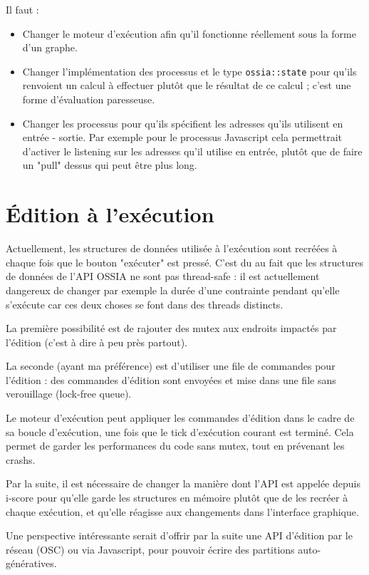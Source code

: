 \documentclass[french,a4paper,openany,12pt]{book}
\begin{document}
Il faut : 
\begin{itemize}
    \item Changer le moteur d'exécution afin qu'il fonctionne réellement sous la forme d'un graphe.
    \item Changer l'implémentation des processus et le type \lstinline|ossia::state| pour qu'ils renvoient un calcul à effectuer plutôt que le résultat de ce calcul ; c'est une forme d'évaluation paresseuse.
    \item Changer les processus pour qu'ils spécifient les adresses qu'ils utilisent en entrée - sortie.
    Par exemple pour le processus Javascript cela permettrait d'activer le listening sur les adresses qu'il utilise en entrée, 
    plutôt que de faire un "pull" dessus qui peut être plus long.
\end{itemize}

\section{Édition à l'exécution}
Actuellement, les structures de données utilisée à l'exécution sont recréées à chaque fois que le bouton "exécuter" est pressé.
C'est du au fait que les structures de données de l'API OSSIA ne sont pas thread-safe : il est actuellement dangereux de changer par exemple 
la durée d'une contrainte pendant qu'elle s'exécute car ces deux choses se font dans des threads distincts.

La première possibilité est de rajouter des mutex aux endroits impactés par l'édition 
(c'est à dire à peu près partout).

La seconde (ayant ma préférence) est d'utiliser une file de commandes pour l'édition : 
des commandes d'édition sont envoyées et mise dans une file sans verouillage (lock-free queue).

Le moteur d'exécution peut appliquer les commandes d'édition dans le cadre de sa boucle d'exécution, 
une fois que le tick d'exécution courant est terminé.
Cela permet de garder les performances du code sans mutex, tout en prévenant les crashs.

Par la suite, il est nécessaire de changer la manière dont l'API est appelée depuis i-score
pour qu'elle garde les structures en mémoire plutôt que de les recréer à chaque exécution, 
et qu'elle réagisse aux changements dans l'interface graphique.

Une perspective intéressante serait d'offrir par la suite une API d'édition par le réseau (OSC) 
ou via Javascript, pour pouvoir écrire des partitions auto-génératives.
\end{document}
